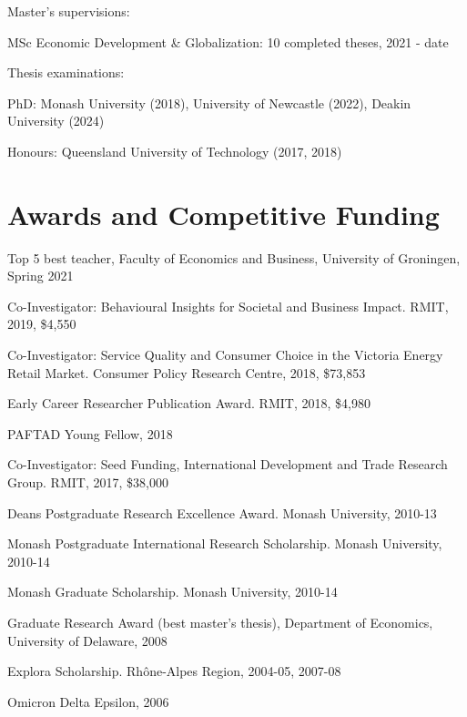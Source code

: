 \documentclass[letterpaper]{article}
\renewenvironment{itemize}{
  \begin{list}{}{
    \setlength{\leftmargin}{1.5em}
  }
}{
  \end{list}
}
\begin{document}
\begin{itemize}
		\item Master's supervisions:
	\begin{itemize}
		\item MSc Economic Development \& Globalization: 10 completed theses, 2021 - date
	\end{itemize}
	
	\item Thesis examinations:
	\begin{itemize}
		\item PhD: Monash University (2018), University of Newcastle (2022), Deakin University (2024)
		\item Honours: Queensland University of Technology (2017, 2018)
	\end{itemize}
	
	
\end{itemize}



\section*{Awards and Competitive Funding}
\begin{itemize}
	\item Top 5 best teacher, Faculty of Economics and Business, University of Groningen, Spring 2021
	\item Co-Investigator: Behavioural Insights for Societal and Business Impact. RMIT, 2019, \$4,550
	\item Co-Investigator: Service Quality and Consumer Choice in the Victoria Energy Retail Market. Consumer Policy Research Centre, 2018, \$73,853
	\item Early Career Researcher Publication Award. RMIT, 2018, \$4,980
	\item PAFTAD Young Fellow, 2018
	\item Co-Investigator: Seed Funding, International Development and Trade Research Group. RMIT, 2017, \$38,000
	\item Dean\textquotesingle s Postgraduate Research Excellence Award. Monash University, 
	2010-13 	
	\item Monash Postgraduate International Research Scholarship. Monash University, 2010-14 	
	\item Monash Graduate Scholarship. Monash University, 2010-14
	\item Graduate Research Award (best master's thesis), Department of Economics, University of Delaware, 2008
	\item Explo\textquotesingle ra Scholarship. Rh\^one-Alpes Region, 2004-05, 2007-08
	\item Omicron Delta Epsilon, 2006
	
\end{itemize}
\end{document}
